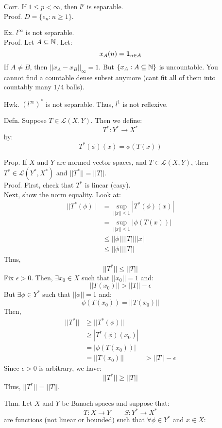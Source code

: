 \documentclass[12pt]{article}
\begin{document}
\begin{itemize}
    \item[Corr.] If $1 \leq p < \infty$, then $l^p$ is separable. \\
    Proof. $D = \{e_n : n \geq 1\}$.  
    \item[Ex.] $l^\infty$ is not separable. \\
    Proof. Let $A \subseteq \mathbb N$. Let: 
    \[ x_A(n) = \mathbf{1}_{n \in A}\]
    If $A \neq B$, then $||x_A - x_B||_\infty = 1$. But $\{x_A : A \subseteq \mathbb N\}$ is uncountable. You cannot find a countable dense subset anymore (cant fit all of them into countably many $1/4$ balls).
    \item[Hwk.] $(l^\infty)^*$ is not separable. Thus, $l^1$ is not reflexive.  
    \item[Defn.] Suppose $T \in \mathcal{L}(X, Y)$. Then we define: 
    \[ T^*: Y^* \to X^*\]
    by: 
    \[ T^*(\phi)(x) = \phi(T(x))\]
    \item[Prop.] If $X$ and $Y$ are normed vector spaces, and $T \in \mathcal{L}(X,Y)$, then $T^* \in \mathcal{L}(Y^*, X^*)$ and $||T^*|| = ||T||$. \\
    Proof. First, check that $T^*$ is linear (easy). \\
    Next, show the norm equality. Look at: 
    \begin{align*}
        ||T^*(\phi)|| &= \sup_{||x|| \leq 1} |T^*(\phi)(x)| \\
        &= \sup_{||x|| \leq 1} |\phi(T(x))| \\
        &\leq ||\phi||||T||||x|| \\
        &\leq ||\phi||||T||
    \end{align*}
    Thus, 
    \[ ||T^*|| \leq ||T||\] 
    Fix $\epsilon > 0$. Then, $\exists x_0 \in X$ such that $||x_0|| = 1$ and: 
    \[ ||T(x_0)|| > ||T|| - \epsilon\]
    But $\exists \phi \in Y^*$ such that $||\phi|| = 1$ and:
    \[ \phi(T(x_0)) = ||T(x_0)|| \]
    Then, 
    \begin{align*}
        ||T^*|| &\geq ||T^*(\phi)|| \\
        &\geq |T^*(\phi)(x_0)| \\
        &= |\phi(T(x_0))| \\
        &= ||T(x_0)||
        &> ||T|| - \epsilon
    \end{align*}
    Since $\epsilon > 0$ is arbitrary, we have:
    \[ ||T^*|| \geq ||T||\]
    Thus, $||T^*|| = ||T||$.
    \item[Thm.] Let $X$ and $Y$ be Banach spaces and suppose that: 
    \[ T: X \to Y \qquad S: Y^* \to X^* \]
    are functions (not linear or bounded) such that $\forall \phi \in Y^*$ and $x \in X$: 

\end{itemize}
\end{document}
